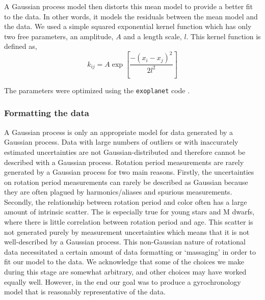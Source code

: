 A Gaussian process model then distorts this mean model to provide a better fit
to the data.
In other words, it models the residuals between the mean model and the data.
We used a simple squared exponential kernel function which has only two free
parameters, an amplitude, $A$ and a length scale, $l$.
This kernel function is defined as,
\begin{equation}
k_{ij} = A \exp\left[{\frac{-(x_i - x_j)^2}{2l^2}}\right]
\end{equation}

The parameters were optimized using the {\tt exoplanet} code \citep{exoplanet}.

\subsubsection{Formatting the data}

A Gaussian process is only an appropriate model for data generated by a
Gaussian process.
Data with large numbers of outliers or with inaccurately estimated
uncertainties are not Gaussian-distributed and therefore cannot be described
with a Gaussian process.
Rotation period measurements are rarely generated by a Gaussian process for
two main reasons.
Firstly, the uncertainties on rotation period measurements can rarely be
described as Gaussian because they are often plagued by harmonics/aliases and
spurious measurements.
Secondly, the relationship between rotation period and color often has a large
amount of intrinsic scatter.
The is especially true for young stars and M dwarfs, where there is little
correlation between rotation period and age.
This scatter is not generated purely by measurement uncertainties which means
that it is not well-described by a Gaussian process.
This non-Gaussian nature of rotational data necessitated a certain amount of
data formatting or `massaging' in order to fit our model to the data.
We acknowledge that some of the choices we make during this stage are somewhat
arbitrary, and other choices may have worked equally well.
However, in the end our goal was to produce a gyrochronology model that is
reasonably representative of the data.


